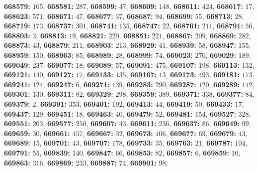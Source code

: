 \textsf{\bfseries 668579:} $105$, \textsf{\bfseries 668581:} $287$, \textsf{\bfseries 668599:} $47$, \textsf{\bfseries 668609:} $148$, \textsf{\bfseries 668611:} $424$, \textsf{\bfseries 668617:} $17$, \textsf{\bfseries 668623:} $571$, \textsf{\bfseries 668671:} $47$, \textsf{\bfseries 668677:} $37$, \textsf{\bfseries 668687:} $94$, \textsf{\bfseries 668699:} $55$, \textsf{\bfseries 668713:} $28$, \textsf{\bfseries 668719:} $173$, \textsf{\bfseries 668737:} $301$, \textsf{\bfseries 668741:} $135$, \textsf{\bfseries 668747:} $22$, \textsf{\bfseries 668761:} $211$, \textsf{\bfseries 668791:} $56$, \textsf{\bfseries 668803:} $3$, \textsf{\bfseries 668813:} $19$, \textsf{\bfseries 668821:} $220$, \textsf{\bfseries 668851:} $221$, \textsf{\bfseries 668867:} $209$, \textsf{\bfseries 668869:} $282$, \textsf{\bfseries 668873:} $43$, \textsf{\bfseries 668879:} $211$, \textsf{\bfseries 668903:} $213$, \textsf{\bfseries 668929:} $41$, \textsf{\bfseries 668939:} $58$, \textsf{\bfseries 668947:} $155$, \textsf{\bfseries 668959:} $150$, \textsf{\bfseries 668963:} $85$, \textsf{\bfseries 668989:} $28$, \textsf{\bfseries 668999:} $74$, \textsf{\bfseries 669023:} $270$, \textsf{\bfseries 669029:} $189$, \textsf{\bfseries 669049:} $237$, \textsf{\bfseries 669077:} $18$, \textsf{\bfseries 669089:} $57$, \textsf{\bfseries 669091:} $475$, \textsf{\bfseries 669107:} $198$, \textsf{\bfseries 669113:} $132$, \textsf{\bfseries 669121:} $140$, \textsf{\bfseries 669127:} $17$, \textsf{\bfseries 669133:} $135$, \textsf{\bfseries 669167:} $13$, \textsf{\bfseries 669173:} $493$, \textsf{\bfseries 669181:} $173$, \textsf{\bfseries 669241:} $124$, \textsf{\bfseries 669247:} $6$, \textsf{\bfseries 669271:} $139$, \textsf{\bfseries 669283:} $290$, \textsf{\bfseries 669287:} $120$, \textsf{\bfseries 669289:} $112$, \textsf{\bfseries 669301:} $130$, \textsf{\bfseries 669311:} $82$, \textsf{\bfseries 669329:} $298$, \textsf{\bfseries 669359:} $389$, \textsf{\bfseries 669371:} $338$, \textsf{\bfseries 669377:} $84$, \textsf{\bfseries 669379:} $2$, \textsf{\bfseries 669391:} $353$, \textsf{\bfseries 669401:} $192$, \textsf{\bfseries 669413:} $44$, \textsf{\bfseries 669419:} $50$, \textsf{\bfseries 669433:} $17$, \textsf{\bfseries 669437:} $129$, \textsf{\bfseries 669451:} $18$, \textsf{\bfseries 669463:} $40$, \textsf{\bfseries 669479:} $52$, \textsf{\bfseries 669481:} $154$, \textsf{\bfseries 669527:} $328$, \textsf{\bfseries 669551:} $203$, \textsf{\bfseries 669577:} $250$, \textsf{\bfseries 669607:} $43$, \textsf{\bfseries 669611:} $236$, \textsf{\bfseries 669637:} $86$, \textsf{\bfseries 669649:} $99$, \textsf{\bfseries 669659:} $30$, \textsf{\bfseries 669661:} $457$, \textsf{\bfseries 669667:} $32$, \textsf{\bfseries 669673:} $106$, \textsf{\bfseries 669677:} $69$, \textsf{\bfseries 669679:} $43$, \textsf{\bfseries 669689:} $15$, \textsf{\bfseries 669701:} $43$, \textsf{\bfseries 669707:} $178$, \textsf{\bfseries 669733:} $35$, \textsf{\bfseries 669763:} $21$, \textsf{\bfseries 669787:} $104$, \textsf{\bfseries 669791:} $55$, \textsf{\bfseries 669839:} $140$, \textsf{\bfseries 669847:} $66$, \textsf{\bfseries 669853:} $82$, \textsf{\bfseries 669857:} $6$, \textsf{\bfseries 669859:} $10$, \textsf{\bfseries 669863:} $316$, \textsf{\bfseries 669869:} $233$, \textsf{\bfseries 669887:} $74$, \textsf{\bfseries 669901:} $98$, 
